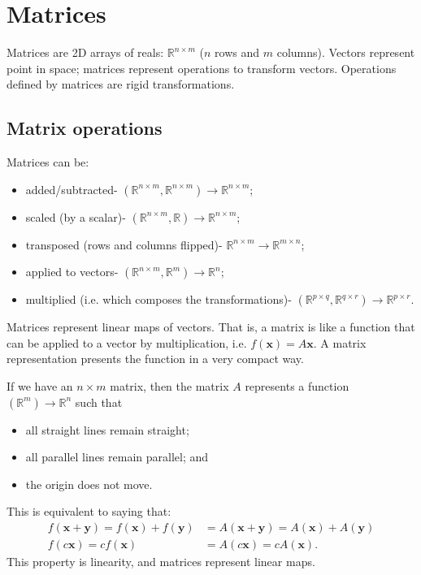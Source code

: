 \documentclass[a4paper, openany]{memoir}
\begin{document}
    \section{Matrices}
    Matrices are 2D arrays of reals: $\mathbb{R}^{n \times m}$ ($n$ rows and $m$ columns). Vectors represent point in space; matrices represent operations to transform vectors. Operations defined by matrices are rigid transformations.
    \subsection{Matrix operations}
    Matrices can be:
    \begin{itemize}
        \item added/subtracted- $(\mathbb{R}^{n \times m}, \mathbb{R}^{n \times m})\to \mathbb{R}^{n \times m}$;
        \item scaled (by a scalar)- $(\mathbb{R}^{n \times m}, \mathbb{R}) \to \mathbb{R}^{n \times m}$;
        \item transposed (rows and columns flipped)- $\mathbb{R}^{n \times m} \to \mathbb{R}^{m \times n}$;
        \item applied to vectors- $(\mathbb{R}^{n \times m}, \mathbb{R}^m) \to \mathbb{R}^n$;
        \item multiplied (i.e. which composes the transformations)- $(\mathbb{R}^{p \times q}, \mathbb{R}^{q \times r}) \to \mathbb{R}^{p \times r}$.
    \end{itemize}

    Matrices represent linear maps of vectors. That is, a matrix is like a function that can be applied to a vector by multiplication, i.e. $f(\mathbf{x}) = A \mathbf{x}$. A matrix representation presents the function in a very compact way.

    If we have an $n \times m$ matrix, then the matrix $A$ represents a function $(\mathbb{R}^m) \to \mathbb{R}^n$ such that
    \begin{itemize}
        \item all straight lines remain straight;
        \item all parallel lines remain parallel; and
        \item the origin does not move.
    \end{itemize}
    This is equivalent to saying that:
    \begin{align*}
        f(\mathbf{x}+\mathbf{y}) = f(\mathbf{x}) + f(\mathbf{y}) &= A(\mathbf{x}+\mathbf{y}) = A(\mathbf{x}) + A(\mathbf{y}) \\
        f(c\mathbf{x}) = cf(\mathbf{x}) &= A(c\mathbf{x}) = cA(\mathbf{x}).
    \end{align*}
    This property is linearity, and matrices represent linear maps.
\end{document}
